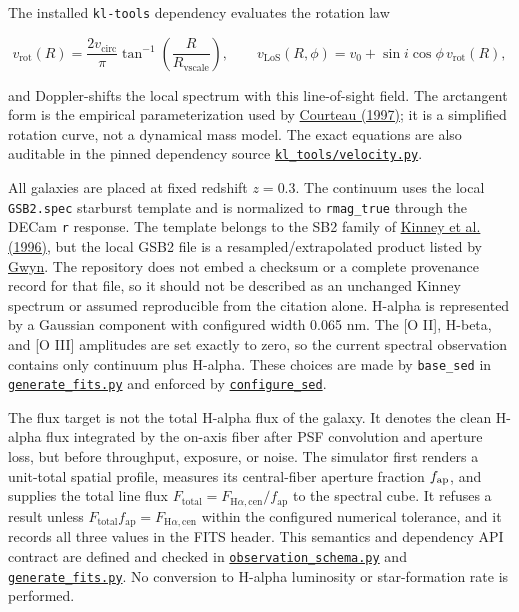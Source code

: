 \documentclass[11pt]{article}
\newcommand{\code}[1]{\nolinkurl{#1}}
\begin{document}
The installed \code{kl-tools} dependency evaluates the rotation law

\[
v_\mathrm{rot}(R)=\frac{2v_\mathrm{circ}}{\pi}
\tan^{-1}\!\left(\frac{R}{R_\mathrm{vscale}}\right),
\qquad
v_\mathrm{LoS}(R,\phi)=v_0+\sin i\cos\phi\,v_\mathrm{rot}(R),
\]

and Doppler-shifts the local spectrum with this line-of-sight field. The
arctangent form is the empirical parameterization used by \hyperlink{ref:courteau1997}{Courteau (1997)}; it is a simplified rotation curve, not a dynamical mass
model. The exact equations are also auditable in the pinned dependency source
\href{https://github.com/wxs0703/kl-tools/blob/42e06b69e11f0282521c53aac8f5093ce52e3bf9/kl_tools/velocity.py}{\code{kl_tools/velocity.py}}.

All galaxies are placed at fixed redshift \(z=0.3\). The continuum uses the
local \code{GSB2.spec} starburst template and is normalized to \code{rmag_true} through
the DECam \code{r} response. The template belongs to the SB2 family of \hyperlink{ref:kinney1996}{Kinney et al. (1996)}, but the local GSB2 file is a resampled/extrapolated
product listed by \hyperlink{ref:gwyn}{Gwyn}. The repository does not embed a checksum or a
complete provenance record for that file, so it should not be described as an
unchanged Kinney spectrum or assumed reproducible from the citation alone.
H-alpha is represented by a Gaussian component with
configured width 0.065 nm. The [O II], H-beta, and [O III] amplitudes are set
exactly to zero, so the current spectral observation contains only continuum
plus H-alpha. These choices are made by \code{base_sed} in
\href{../data_generate/generate_fits.py}{\code{generate_fits.py}} and enforced by
\href{../data_generate/observation_schema.py}{\code{configure_sed}}.

The flux target is not the total H-alpha flux of the galaxy. It denotes the
clean H-alpha flux integrated by the on-axis fiber after PSF convolution and
aperture loss, but before throughput, exposure, or noise. The simulator first
renders a unit-total spatial profile, measures its central-fiber aperture
fraction \(f_{\rm ap}\), and supplies the total line flux
\(F_\mathrm{total}=F_{\mathrm{H}\alpha,\mathrm{cen}}/f_\mathrm{ap}\) to the spectral cube.
It refuses a result unless
\(F_\mathrm{total}f_\mathrm{ap}=F_{\mathrm{H}\alpha,\mathrm{cen}}\) within the configured
numerical tolerance, and it records all three values in the FITS header. This
semantics and dependency API contract are defined and checked in
\href{../data_generate/observation_schema.py}{\code{observation_schema.py}} and
\href{../data_generate/generate_fits.py}{\code{generate_fits.py}}. No conversion to
H-alpha luminosity or star-formation rate is performed.
\end{document}
